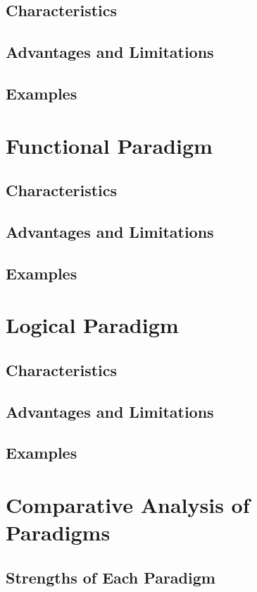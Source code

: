 \documentclass[11pt]{article}
\begin{document}
\subsection{Characteristics}
\subsection{Advantages and Limitations}
\subsection{Examples}

\section{Functional Paradigm}
\subsection{Characteristics}
\subsection{Advantages and Limitations}
\subsection{Examples}

\section{Logical Paradigm}
\subsection{Characteristics}
\subsection{Advantages and Limitations}
\subsection{Examples}

\section{Comparative Analysis of Paradigms}
\subsection{Strengths of Each Paradigm}
\end{document}
